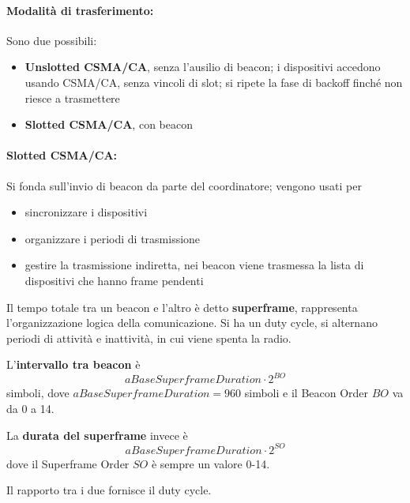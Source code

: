 \paragraph{Modalità di trasferimento:} Sono due possibili: 
\begin{itemize}
    \item \textbf{Unslotted CSMA/CA}, senza l'ausilio di beacon; i dispositivi accedono usando CSMA/CA, senza vincoli di slot; si ripete la fase di backoff finché non riesce a trasmettere
    
    \item \textbf{Slotted CSMA/CA}, con beacon
\end{itemize}

\paragraph{Slotted CSMA/CA:} Si fonda sull'invio di beacon da parte del coordinatore; vengono usati per
\begin{itemize}
    \item sincronizzare i dispositivi
    
    \item organizzare i periodi di trasmissione
    
    \item gestire la trasmissione indiretta, nei beacon viene trasmessa la lista di dispositivi che hanno frame pendenti
\end{itemize}

Il tempo totale tra un beacon e l'altro è detto \textbf{superframe}, rappresenta l'organizzazione logica della comunicazione. Si ha un duty cycle, si alternano periodi di attività e inattività, in cui viene spenta la radio.

L'\textbf{intervallo tra beacon} è
$$ aBaseSuperframeDuration \cdot 2^{BO}$$
simboli, dove $aBaseSuperframeDuration = 960$ simboli e il Beacon Order $BO$ va da 0 a 14.

La \textbf{durata del superframe} invece è
$$ aBaseSuperframeDuration \cdot 2^{SO} $$
dove il Superframe Order $SO$ è sempre un valore 0-14.

Il rapporto tra i due fornisce il duty cycle.

